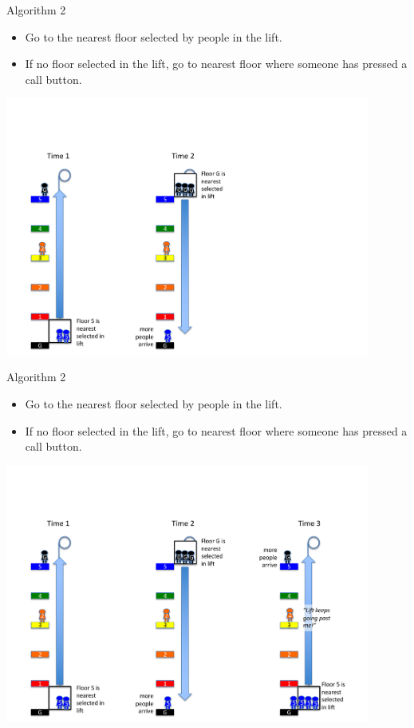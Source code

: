 \documentclass{beamer} %
\begin{document}
\begin{frame}
  \vspace{-10mm}
  \begin{block}{Algorithm 2}
    \begin{itemize}
    \item Go to the nearest floor selected by people in the lift.
    \item If no floor selected in the lift, go to nearest floor where someone has pressed a call button.
    \end{itemize}
  \end{block}
  \centering
  \includegraphics[width=120mm, trim=0mm 0mm 0mm 50mm, clip=true]{img/lift2-anim5.pdf}
\end{frame}

\begin{frame}
  \vspace{-10mm}
  \begin{block}{Algorithm 2}
    \begin{itemize}
    \item Go to the nearest floor selected by people in the lift.
    \item If no floor selected in the lift, go to nearest floor where someone has pressed a call button.
    \end{itemize}
  \end{block}
  \centering
  \includegraphics[width=120mm, trim=0mm 0mm 0mm 50mm, clip=true]{img/lift2-anim6.pdf}
\end{frame}
\end{document}
